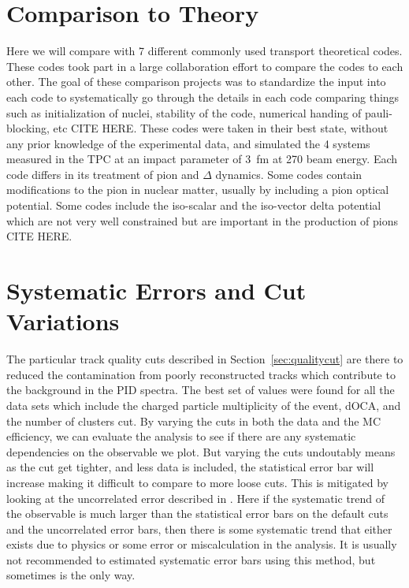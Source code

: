 \section{Comparison to Theory}

Here we will compare with 7 different commonly used transport theoretical codes. These codes took part in a large collaboration effort to compare the codes to each other. The goal of these comparison projects was to standardize the input into each code to systematically go through the details in each code comparing things such as initialization of nuclei, stability of the code, numerical handing of pauli-blocking, etc CITE HERE. These codes were taken in their best state, without any prior knowledge of the experimental data, and simulated the 4 systems measured in the \spirit TPC at an impact parameter of \SI{3}{\femto\metre} at \SI{270}{\MeVA} beam energy. Each code differs in its treatment of pion and $\Delta$ dynamics. Some codes contain modifications to the pion in nuclear matter, usually by including a pion optical potential. Some codes include the iso-scalar and the iso-vector delta potential which are not very well constrained but are important in the production of pions CITE HERE.


\section{Systematic Errors and Cut Variations}
\label{sec:cutvar}
The particular track quality cuts described in Section~\ref{sec:qualitycut} are there to reduced the contamination from poorly reconstructed tracks which contribute to the background in the PID spectra. The best set of values were found for all the data sets which include the charged particle multiplicity of the event, dOCA, and the number of clusters cut. By varying the cuts in both the data and the MC efficiency, we can evaluate the analysis to see if there are any systematic dependencies on the observable we plot. But varying the cuts undoutably means as the cut get tighter, and less data is included, the statistical error bar will increase making it difficult to compare to more loose cuts. This is mitigated by looking at the uncorrelated error described in \cite{dataAnalysis}. Here if the systematic trend of the observable is much larger than the statistical error bars on the default cuts and the uncorrelated error bars, then there is some systematic trend that either exists due to physics or some error or miscalculation in the analysis. It is usually not recommended to estimated systematic error bars using this method, but sometimes is the only way. 


